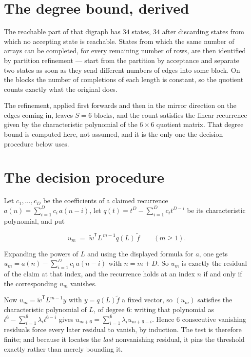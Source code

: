 \documentclass[11pt]{article}
\theoremstyle{definition}
\begin{document}
\section{The degree bound, derived}

The reachable part of that digraph has $34$ states, $34$ after discarding states from which no accepting state is reachable. States from which the same number of arrays can be completed, for every remaining number of rows, are then identified by partition refinement --- start from the partition by acceptance and separate two states as soon as they send different numbers of edges into some block. On the blocks the number of completions of each length is constant, so the quotient counts exactly what the original does.

The refinement, applied first forwards and then in the mirror direction on the edges coming in, leaves $S = 6$ blocks, and the count satisfies the linear recurrence given by the characteristic polynomial of the $6 \times 6$ quotient matrix. That degree bound is computed here, not assumed, and it is the only one the decision procedure below uses.

\section{The decision procedure}

Let $c_1,\dots,c_D$ be the coefficients of a claimed recurrence $a(n) = \sum_{i=1}^{D} c_i\,a(n-i)$, let $q(t) = t^{D} - \sum_{i=1}^{D} c_i t^{D-i}$ be its characteristic polynomial, and put

\[u_m \;=\; \tilde w^{\mathsf T} L^{\,m-1} q(L)\,\tilde f \qquad (m \ge 1).\]

Expanding the powers of $L$ and using the displayed formula for $a$, one gets $u_m = a(n) - \sum_{i=1}^{D} c_i\,a(n-i)$ with $n = m + D$. So $u_m$ is exactly the residual of the claim at that index, and the recurrence holds at an index $n$ if and only if the corresponding $u_m$ vanishes.

Now $u_m = \tilde w^{\mathsf T} L^{m-1} y$ with $y = q(L)\tilde f$ a fixed vector, so $(u_m)$ satisfies the characteristic polynomial of $L$, of degree $6$: writing that polynomial as $t^{6} - \sum_{i=1}^{6} \lambda_i t^{6-i}$ gives $u_{m+6} = \sum_{i=1}^{6} \lambda_i u_{m+6-i}$. Hence $6$ consecutive vanishing residuals force every later residual to vanish, by induction. The test is therefore finite; and because it locates the {\itshape last} nonvanishing residual, it pins the threshold exactly rather than merely bounding it.
\end{document}
